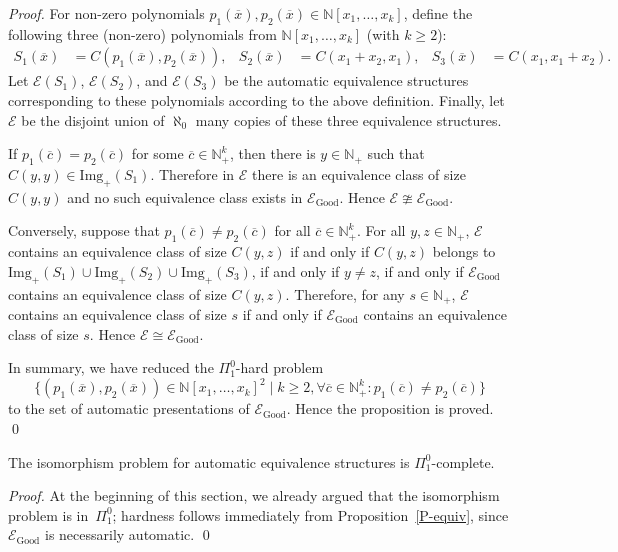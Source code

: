 \documentclass[envcountsame]{llncs}
\newcommand{\E}{\mathcal E}
\newcommand{\Good}{\mathrm{Good}}
\newcommand{\Img}{\mathrm{Img}}
\newcommand{\N}{\mathbb N}
\begin{document}
\begin{proof}
  For non-zero polynomials $p_1(\overline x),p_2(\overline x)\in
  \N[x_1,\ldots,x_k]$, define the following three (non-zero)
  polynomials from $\N[x_1,\ldots,x_k]$ (with $k\ge2$):
  \begin{align*}
    S_1(\overline{x})& = C(p_1(\overline{x}), p_2(\overline{x})), &
    S_2(\overline x) &= C(x_1+x_2,x_1), &
    S_3(\overline x) &= C(x_1, x_1+x_2) .
  \end{align*}
  Let $\E(S_1)$, $\E(S_2)$, and $\E(S_3)$ be the automatic equivalence
  structures corresponding to these polynomials according to the above
  definition. Finally, let $\E$ be the disjoint union of
  $\aleph_0$ many copies of these three equivalence structures.

  If $p_1(\overline c)=p_2(\overline c)$ for some $\overline c\in
  \N_+^k$, then there is $y\in \N_+$ such that $C(y,y) \in \Img_+(S_1)$.
  Therefore in $\E$ there is an equivalence class of size $C(y,y)$ and
  no such equivalence class exists in $\E_\Good$. Hence $\E
  \ncong \E_\Good$.

  Conversely, suppose that $p_1(\overline c)\neq p_2(\overline c)$ for
  all $\overline c\in \N_+^k$.  For all $y,z\in \N_+$, $\E$ contains
  an equivalence class of size $C(y,z)$ if and only if $C(y,z)$
  belongs to $\Img_+(S_1) \cup \Img_+(S_2) \cup \Img_+(S_3)$, if and
  only if $y\neq z$, if and only if $\E_\Good$ contains an equivalence
  class of size $C(y,z)$. Therefore, for any $s\in \N_+$, $\E$ contains
  an equivalence class of size $s$ if and only if $\E_\Good$ contains
  an equivalence class of size $s$. Hence $\E\cong \E_\Good$.

  In summary, we have reduced the $\Pi^0_1$-hard problem 
  \[
     \{(p_1(\overline x),p_2(\overline x))\in\N[x_1,\dots,x_k]^2 
      \mid k\ge2,\forall\overline c\in\N_+^k:p_1(\overline c)\neq p_2(\overline c)\}
  \]
  to the set of automatic presentations of $\E_\Good$.
  Hence the proposition is proved.
\qed
\end{proof} 

\begin{theorem}\label{thm:equiv}
  The isomorphism problem for automatic equivalence structures is
  $\Pi^0_1$-complete.
\end{theorem}

\begin{proof}
  At the beginning of this section, we already argued that the
  isomorphism problem is in~$\Pi^0_1$; hardness follows immediately
  from Proposition~\ref{P-equiv}, since $\E_\Good$ is necessarily automatic.
\qed
\end{proof}
\end{document}

